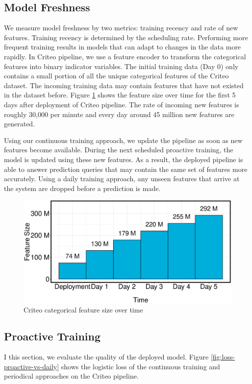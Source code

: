 \subsection{Model Freshness}\label{subsec:model-freshness}
We measure model freshness by two metrics: training recency and rate of new features.
Training recency is determined by the scheduling rate.
Performing more frequent training results in models that can adapt to changes in the data more rapidly.
In Criteo pipeline, we use a feature encoder to transform the categorical features into binary indicator variables.
The initial training data (Day 0) only contains a small portion of all the unique categorical features of the Criteo dataset.
The incoming training data may contain features that have not existed in the dataset before.
Figure \ref{fig:criteo-feature-discovery} shows the feature size over time for the first 5 days after deployment of Criteo pipeline.
The rate of incoming new features is roughly 30,000 per minute and every day around 45 million new features are generated.

Using our continuous training approach, we update the pipeline as soon as new features become available.
During the next scheduled proactive training, the model is updated using these new features.
As a result, the deployed pipeline is able to answer prediction queries that may contain the same set of features more accurately.
Using a daily training approach, any unseen features that arrive at the system are dropped before a prediction is made.

\begin{figure}[H]
\includegraphics[width=\columnwidth]{../images/experiment-results/criteo-feature-discovery-experiment.eps}
\caption{Criteo categorical feature size over time}
\label{fig:criteo-feature-discovery}
\end{figure}


\subsection{Proactive Training}
I this section, we evaluate the quality of the deployed model.
Figure \ref{fig:loss-proactive-vs-daily} shows the logistic loss of the continuous training and periodical approaches on the Criteo pipeline.

